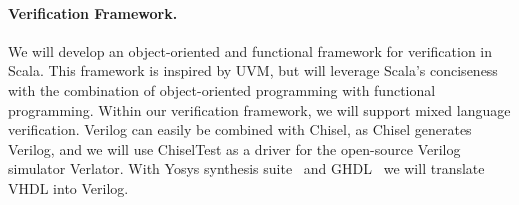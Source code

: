\documentclass[fleqn,12pt]{article}
\begin{document}
\paragraph{Verification Framework.}

We will develop an object-oriented and functional framework for verification in Scala.
This framework is inspired by UVM, but will leverage Scala's conciseness with the
combination of object-oriented programming with functional programming.
%
Within our verification framework, we will support mixed language verification.
Verilog can easily be combined with Chisel, as Chisel generates Verilog, and
we will use ChiselTest as a driver for the open-source Verilog simulator Verlator.
With Yosys synthesis suite~\cite{Yosys} and GHDL~\cite{ghdl}
we will translate VHDL into Verilog.

%
%
%
\end{document}
